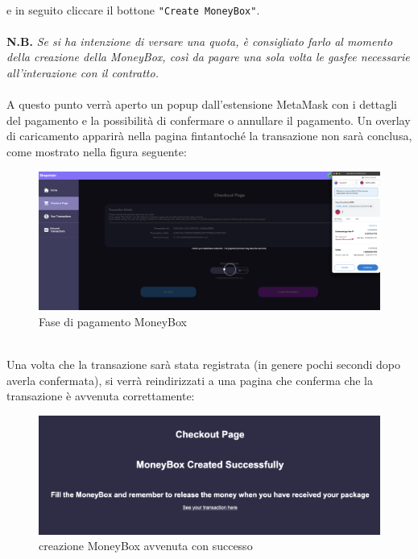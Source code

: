             \textbf{}\\
            e in seguito cliccare il bottone \texttt{"Create MoneyBox"}.\\\\
            \textbf{N.B.} \textit{Se si ha intenzione di versare una quota, è consigliato farlo al momento della creazione della MoneyBox, così da pagare una sola volta le gasfee necessarie all'interazione con il contratto.}\\\\
            A questo punto verrà aperto un popup dall'estensione MetaMask con i dettagli del pagamento e la possibilità di confermare o annullare il pagamento. Un overlay di caricamento apparirà nella pagina \projectName{} fintantoché la transazione non sarà conclusa, come mostrato nella figura seguente:
            \begin{figure}[H]
                \centering
                \includegraphics[scale=0.15]{immagini/Checkout/MoneyBoxLayer.png}
                \caption{Fase di pagamento MoneyBox}
            \end{figure}
            \textbf{}\\
            Una volta che la transazione sarà stata registrata (in genere pochi secondi dopo averla confermata), si verrà reindirizzati a una pagina che conferma che la transazione è avvenuta correttamente:
            \begin{figure}[H]
                \centering
                \includegraphics[scale=0.3]{immagini/Checkout/MoneyBoxTransactionSuccess.png}
                \caption{creazione MoneyBox avvenuta con successo}
            \end{figure}
